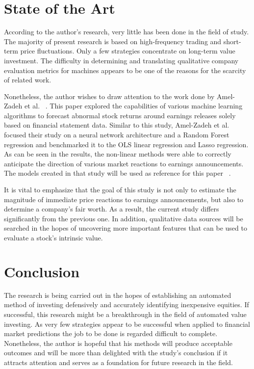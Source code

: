 \documentclass{imc-inf}
\begin{document}
\section{State of the Art}%
According to the author's research, very little has been done in the field of study. The majority of present research is based on high-frequency trading and short-term price fluctuations. Only a few strategies concentrate on long-term value investment. The difficulty in determining and translating qualitative company evaluation metrics for machines appears to be one of the reasons for the scarcity of related work.

Nonetheless, the author wishes to draw attention to the work done by Amel-Zadeh et al. ~\cite{ml-based_fin_statement_analysis}. This paper explored the capabilities of various machine learning algorithms to forecast abnormal stock returns around earnings releases solely based on financial statement data. Similar to this study, Amel-Zadeh et al. ~\cite{ml-based_fin_statement_analysis} focused their study on a neural network architecture and a Random Forest regression and benchmarked it to the OLS linear regression and Lasso regression. As can be seen in the results, the non-linear methods were able to correctly anticipate the direction of various market reactions to earnings announcements. The models created in that study will be used as reference for this paper ~\cite{ml-based_fin_statement_analysis}.

It is vital to emphasize that the goal of this study is not only to estimate the magnitude of immediate price reactions to earnings announcements, but also to determine a company's fair worth. As a result, the current study differs significantly from the previous one. In addition, qualitative data sources will be searched in the hopes of uncovering more important features that can be used to evaluate a stock's intrinsic value.

\section{Conclusion}
The research is being carried out in the hopes of establishing an automated method of investing defensively and accurately identifying inexpensive equities. If successful, this research might be a breakthrough in the field of automated value investing. As very few strategies appear to be successful when applied to financial market predictions the job to be done is regarded difficult to complete. Nonetheless, the author is hopeful that his methods will produce acceptable outcomes and will be more than delighted with the study's conclusion if it attracts attention and serves as a foundation for future research in the field.

%
%
%
%
%

\backmatter%
	
	
	
\end{document}
